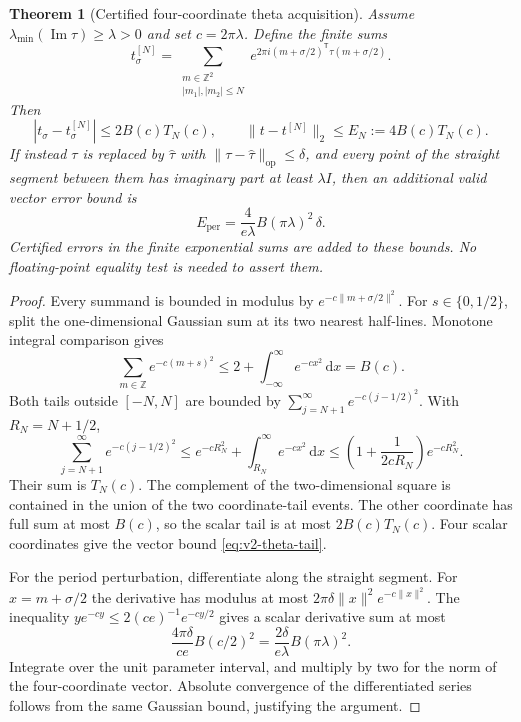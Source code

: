 \documentclass[11pt]{article}
\newtheorem{theorem}{Theorem}[section]
\theoremstyle{definition}
\theoremstyle{remark}
\newcommand{\Z}{\mathbb Z}
\newcommand{\op}{\mathrm{op}}
\newcommand{\dd}{\mathrm d}
\newcommand{\norm}[1]{\lVert#1\rVert}
\begin{document}
\begin{theorem}[Certified four-coordinate theta acquisition]
\label{thm:v2-theta-tail}
Assume $\lambda_{\min}(\operatorname{Im}\tau)\ge\lambda>0$ and set
$c=2\pi\lambda$. Define the finite sums
\begin{equation}
 t^{[N]}_\sigma=
 \sum_{\substack{m\in\Z^2\\ |m_1|,|m_2|\le N}}
 e^{2\pi i(m+\sigma/2)^{\mathsf T}\tau(m+\sigma/2)}.
 \label{eq:v2-theta-finite}
\end{equation}
Then
\begin{equation}
 |t_\sigma-t^{[N]}_\sigma|\le2B(c)T_N(c),\qquad
 \boxed{\norm{t-t^{[N]}}_2\le E_N:=4B(c)T_N(c).}
 \label{eq:v2-theta-tail}
\end{equation}
If instead $\tau$ is replaced by $\widehat\tau$ with
$\norm{\tau-\widehat\tau}_{\op}\le\delta$, and every point of the
straight segment between them has imaginary part at least $\lambda I$,
then an additional valid vector error bound is
\begin{equation}
 \boxed{E_{\mathrm{per}}=
       \frac{4}{e\lambda}B(\pi\lambda)^2\,\delta.}
 \label{eq:v2-period-error}
\end{equation}
Certified errors in the finite exponential sums are added to these bounds.
No floating-point equality test is needed to assert them.
\end{theorem}
\begin{proof}
Every summand is bounded in modulus by
$e^{-c\norm{m+\sigma/2}^2}$. For $s\in\{0,1/2\}$, split the one-dimensional
Gaussian sum at its two nearest half-lines. Monotone integral comparison
gives
\[
 \sum_{m\in\Z}e^{-c(m+s)^2}\le2+\int_{-\infty}^{\infty}e^{-cx^2}\,\dd x=B(c).
\]
Both tails outside $[-N,N]$ are bounded by
$\sum_{j=N+1}^\infty e^{-c(j-1/2)^2}$. With $R_N=N+1/2$,
\[
 \sum_{j=N+1}^\infty e^{-c(j-1/2)^2}
 \le e^{-cR_N^2}+\int_{R_N}^{\infty}e^{-cx^2}\,\dd x
 \le\left(1+\frac1{2cR_N}\right)e^{-cR_N^2}.
\]
Their sum is $T_N(c)$. The complement of the two-dimensional square is
contained in the union of the two coordinate-tail events. The other
coordinate has full sum at most $B(c)$, so the scalar tail is at most
$2B(c)T_N(c)$. Four scalar coordinates give the vector bound
\eqref{eq:v2-theta-tail}.

For the period perturbation, differentiate along the straight segment. For
$x=m+\sigma/2$ the derivative has modulus at most
$2\pi\delta\norm x^2e^{-c\norm x^2}$. The inequality
$y e^{-cy}\le 2(ce)^{-1}e^{-cy/2}$ gives a scalar derivative sum at most
\[
 \frac{4\pi\delta}{ce}B(c/2)^2
 =\frac{2\delta}{e\lambda}B(\pi\lambda)^2.
\]
Integrate over the unit parameter interval, and multiply by two for the norm
of the four-coordinate vector. Absolute convergence of the differentiated
series follows from the same Gaussian bound, justifying the argument.
\end{proof}
\end{document}
